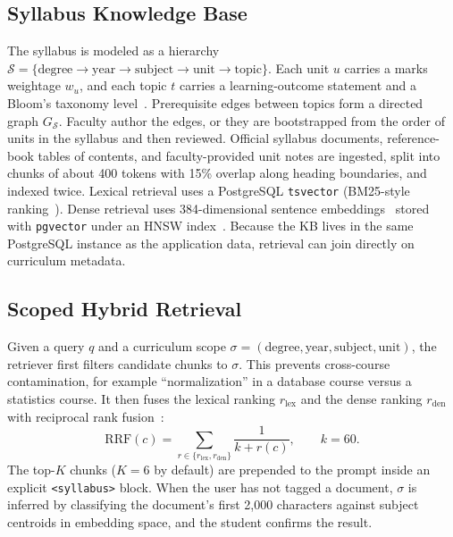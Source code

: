 \documentclass[conference]{IEEEtran}
\begin{document}
\subsection{Syllabus Knowledge Base}
The syllabus is modeled as a hierarchy
$\mathcal{S} = \{\text{degree} \rightarrow \text{year} \rightarrow
\text{subject} \rightarrow \text{unit} \rightarrow \text{topic}\}$.
Each unit $u$ carries a marks weightage $w_u$, and each topic $t$ carries a
learning-outcome statement and a Bloom's taxonomy level~\cite{anderson2001taxonomy}.
Prerequisite edges between topics form a directed graph $G_{\mathcal{S}}$.
Faculty author the edges, or they are bootstrapped from the order of units in
the syllabus and then reviewed. Official syllabus documents, reference-book
tables of contents, and faculty-provided unit notes are ingested, split into
chunks of about 400 tokens with 15\% overlap along heading boundaries, and
indexed twice. Lexical retrieval uses a PostgreSQL \texttt{tsvector}
(BM25-style ranking~\cite{robertson2009bm25}). Dense retrieval uses 384-dimensional
sentence embeddings~\cite{reimers2019sbert,xiao2024cpack} stored with
\texttt{pgvector} under an HNSW index~\cite{malkov2020hnsw}. Because the KB
lives in the same PostgreSQL instance as the application data, retrieval can
join directly on curriculum metadata.

\subsection{Scoped Hybrid Retrieval}
\label{sec:retrieval}
Given a query $q$ and a curriculum scope
$\sigma = (\text{degree}, \text{year}, \text{subject}, \text{unit})$, the
retriever first filters candidate chunks to $\sigma$. This prevents
cross-course contamination, for example ``normalization'' in a database
course versus a statistics course. It then fuses the lexical ranking
$r_{\text{lex}}$ and the dense ranking $r_{\text{den}}$ with reciprocal rank
fusion~\cite{cormack2009rrf}:
\begin{equation}
\mathrm{RRF}(c) = \sum_{r \in \{r_{\text{lex}}, r_{\text{den}}\}}
\frac{1}{k + r(c)}, \qquad k = 60.
\label{eq:rrf}
\end{equation}
The top-$K$ chunks ($K{=}6$ by default) are prepended to the prompt inside an
explicit \texttt{<syllabus>} block. When the user has not tagged a document,
$\sigma$ is inferred by classifying the document's first 2{,}000 characters
against subject centroids in embedding space, and the student confirms the
result.
\end{document}
